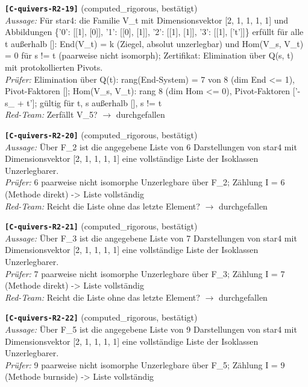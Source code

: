 \documentclass[11pt]{article}
\theoremstyle{definition}\newtheorem{definition}[theorem]{Definition}\newtheorem{remark}[theorem]{Remark}\newtheorem{observation}[theorem]{Numerical observation}
\begin{document}
\noindent\textbf{\texttt{[C-quivers-R2-19]}} (computed\_rigorous, bestätigt)\\
\textit{Aussage:} Für star4: die Familie V\_t mit Dimensionsvektor [2, 1, 1, 1, 1] und Abbildungen \{'0': [[1], [0]], '1': [[0], [1]], '2': [[1], [1]], '3': [[1], ['t']]\} erfüllt für alle t außerhalb []: End(V\_t) = k (Ziegel, absolut unzerlegbar) und Hom(V\_s, V\_t) = 0 für s != t (paarweise nicht isomorph); Zertifikat: Elimination über Q(s, t) mit protokollierten Pivots.\\
\textit{Prüfer:} Elimination über Q(t): rang(End-System) = 7 von 8 (dim End <= 1), Pivot-Faktoren []; Hom(V\_s, V\_t): rang 8 (dim Hom <= 0), Pivot-Faktoren ['-s\_ + t']; gültig für t, s außerhalb [], s != t\\
\textit{Red-Team:} Zerfällt V\_5? $\to$ durchgefallen\par\medskip
\noindent\textbf{\texttt{[C-quivers-R2-20]}} (computed\_rigorous, bestätigt)\\
\textit{Aussage:} Über F\_2 ist die angegebene Liste von 6 Darstellungen von star4 mit Dimensionsvektor [2, 1, 1, 1, 1] eine vollständige Liste der Isoklassen Unzerlegbarer.\\
\textit{Prüfer:} 6 paarweise nicht isomorphe Unzerlegbare über F\_2; Zählung I = 6 (Methode direkt) -> Liste vollständig\\
\textit{Red-Team:} Reicht die Liste ohne das letzte Element? $\to$ durchgefallen\par\medskip
\noindent\textbf{\texttt{[C-quivers-R2-21]}} (computed\_rigorous, bestätigt)\\
\textit{Aussage:} Über F\_3 ist die angegebene Liste von 7 Darstellungen von star4 mit Dimensionsvektor [2, 1, 1, 1, 1] eine vollständige Liste der Isoklassen Unzerlegbarer.\\
\textit{Prüfer:} 7 paarweise nicht isomorphe Unzerlegbare über F\_3; Zählung I = 7 (Methode direkt) -> Liste vollständig\\
\textit{Red-Team:} Reicht die Liste ohne das letzte Element? $\to$ durchgefallen\par\medskip
\noindent\textbf{\texttt{[C-quivers-R2-22]}} (computed\_rigorous, bestätigt)\\
\textit{Aussage:} Über F\_5 ist die angegebene Liste von 9 Darstellungen von star4 mit Dimensionsvektor [2, 1, 1, 1, 1] eine vollständige Liste der Isoklassen Unzerlegbarer.\\
\textit{Prüfer:} 9 paarweise nicht isomorphe Unzerlegbare über F\_5; Zählung I = 9 (Methode burnside) -> Liste vollständig\\
\end{document}
